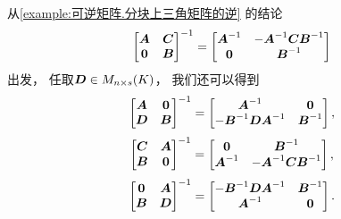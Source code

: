\begin{remark}
从\cref{example:可逆矩阵.分块上三角矩阵的逆} 的结论\[
	\begin{bmatrix}
		\boldsymbol{A} & \boldsymbol{C} \\
		\boldsymbol0 & \boldsymbol{B}
	\end{bmatrix}^{-1}
	= \begin{bmatrix}
		\boldsymbol{A}^{-1} & -\boldsymbol{A}^{-1} \boldsymbol{C} \boldsymbol{B}^{-1} \\
		\boldsymbol0 & \boldsymbol{B}^{-1}
	\end{bmatrix}
\]出发，
任取\(\boldsymbol{D} \in M_{n \times s}(K)\)，
我们还可以得到\[
	\begin{bmatrix}
		\boldsymbol{A} & \boldsymbol0 \\
		\boldsymbol{D} & \boldsymbol{B}
	\end{bmatrix}^{-1}
	= \begin{bmatrix}
		\boldsymbol{A}^{-1} & \boldsymbol0 \\
		-\boldsymbol{B}^{-1} \boldsymbol{D} \boldsymbol{A}^{-1} & \boldsymbol{B}^{-1}
	\end{bmatrix},
\]\[
	\begin{bmatrix}
		\boldsymbol{C} & \boldsymbol{A} \\
		\boldsymbol{B} & \boldsymbol0
	\end{bmatrix}^{-1}
	= \begin{bmatrix}
		\boldsymbol0 & \boldsymbol{B}^{-1} \\
		\boldsymbol{A}^{-1} & -\boldsymbol{A}^{-1}\boldsymbol{C}\boldsymbol{B}^{-1}
	\end{bmatrix},
\]\[
	\begin{bmatrix}
		\boldsymbol0 & \boldsymbol{A} \\
		\boldsymbol{B} & \boldsymbol{D}
	\end{bmatrix}^{-1}
	= \begin{bmatrix}
		-\boldsymbol{B}^{-1}\boldsymbol{D}\boldsymbol{A}^{-1} & \boldsymbol{B}^{-1} \\
		\boldsymbol{A}^{-1} & \boldsymbol0
	\end{bmatrix}.
\]


\end{remark}
